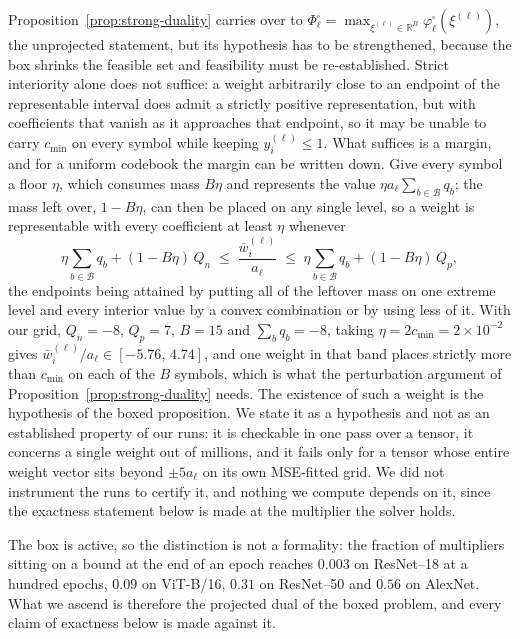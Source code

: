 \documentclass{article}
\begin{document}
Proposition~\ref{prop:strong-duality} carries over to
$\Phi_\ell^{\square}=\max_{\xi^{(\ell)}\in\mathbb R^{B}}
\varphi_\ell^{\square}(\xi^{(\ell)})$, the unprojected statement, but
its hypothesis has to be strengthened, because the box shrinks the feasible set
and feasibility must be re-established. Strict interiority alone does not suffice:
a weight arbitrarily close to an endpoint of the representable interval does admit
a strictly positive representation, but with coefficients that vanish as it
approaches that endpoint, so it may be unable to carry $c_{\min}$ on every symbol
while keeping $y_i^{(\ell)}\leq1$. What suffices is a margin, and for a uniform
codebook the margin can be written down. Give every symbol a floor $\eta$, which
consumes mass $B\eta$ and represents the value
$\eta a_\ell\sum_{b\in\mathcal B}q_b$; the mass left over, $1-B\eta$, can then be
placed on any single level, so a weight is representable with every coefficient at
least $\eta$ whenever
\[
  \eta\sum_{b\in\mathcal B}q_b+(1-B\eta)\,Q_n
  \;\leq\;
  \frac{\bar w_i^{(\ell)}}{a_\ell}
  \;\leq\;
  \eta\sum_{b\in\mathcal B}q_b+(1-B\eta)\,Q_p ,
\]
the endpoints being attained by putting all of the leftover mass on one extreme
level and every interior value by a convex combination or by using less of it.
With our grid, $Q_n=-8$, $Q_p=7$, $B=15$ and $\sum_b q_b=-8$, taking
$\eta=2c_{\min}=2\times10^{-2}$ gives
$\bar w_i^{(\ell)}/a_\ell\in[-5.76,\,4.74]$, and one weight in that band places
strictly more than $c_{\min}$ on each of the $B$ symbols, which is what the
perturbation argument of Proposition~\ref{prop:strong-duality} needs.
The existence of such a weight is the hypothesis of the boxed proposition. We
state it as a hypothesis and not as an established property of our runs: it is
checkable in one pass over a tensor, it concerns a single weight out of millions,
and it fails only for a tensor whose entire weight vector sits beyond $\pm5a_\ell$
on its own MSE-fitted grid. We did not instrument the runs to certify it, and
nothing we compute depends on it, since the exactness statement below is made at
the multiplier the solver holds.

The box is active, so the distinction is not a formality: the fraction of
multipliers sitting on a bound at the end of an epoch reaches $0.003$ on
ResNet--18 at a hundred epochs, $0.09$ on ViT-B/16, $0.31$ on ResNet--50 and
$0.56$ on AlexNet. What we ascend is therefore the projected dual of the boxed
problem, and every claim of exactness below is made against it.
\end{document}
